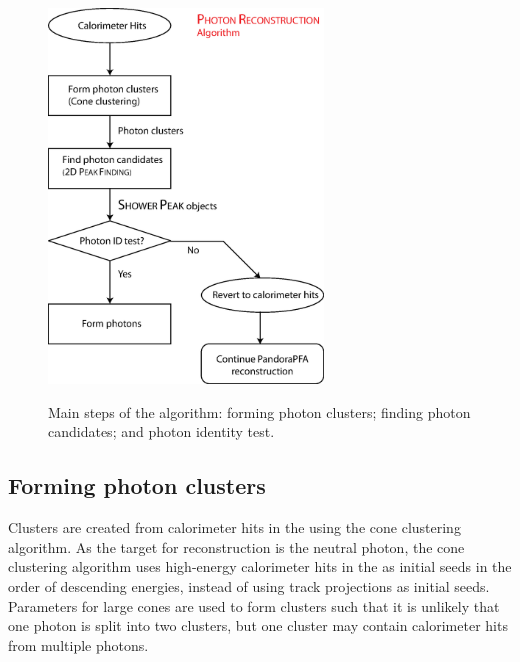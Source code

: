 \begin{figure}[tbph]
\centering
{\includegraphics[width=0.65\textwidth]{photon/photonRecoFlow3}}
\caption[A flow diagram of the \PhotonReconstruction algorithm.]
{Main steps of the \PhotonReconstruction algorithm: forming photon clusters; finding photon candidates; and photon identity test.}
\label{fig:photonPhotonRecoFlow}
\end{figure}


\subsection{Forming photon clusters}



Clusters are created from calorimeter hits in the \ECAL using the cone clustering algorithm. As the target for reconstruction is the neutral photon, the cone clustering algorithm uses high-energy calorimeter hits in the \ECAL as initial seeds in the order of descending energies, instead of using track projections as initial seeds.  Parameters for large cones are used to form clusters such that it is unlikely that one photon is split into two clusters, but one cluster may contain calorimeter hits from  multiple photons.

